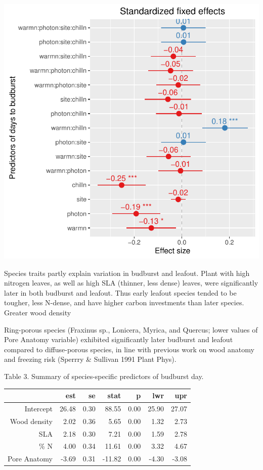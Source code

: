 \documentclass[11pt]{article}
\begin{document}
\includegraphics[scale=0.5]{lmerDBB}


Species traits partly explain variation in budburst and leafout. Plant with high nitrogen leaves, as well as high SLA (thinner, less dense) leaves, were significantly later in both budburst and leafout. Thus early leafout species tended to be tougher, less N-dense, and have higher carbon investments than later species. Greater wood density

Ring-porous species (Fraxinus sp., Lonicera, Myrica, and Quercus; lower values of Pore Anatomy variable) exhibited significantly later budburst and leafout compared to diffuse-porous species, in line with previous work on wood anatomy and freezing risk (Sperrry \& Sullivan 1991 Plant Phys).


Table 3. Summary of species-specific predictors of budburst day. 
\begin{table}[ht]
\centering
\begin{tabular}{rrrrrrr}
  \hline
 & est & se & stat & p & lwr & upr \\ 
  \hline
Intercept & 26.48 & 0.30 & 88.55 & 0.00 & 25.90 & 27.07 \\ 
  Wood density & 2.02 & 0.36 & 5.65 & 0.00 & 1.32 & 2.73 \\ 
  SLA & 2.18 & 0.30 & 7.21 & 0.00 & 1.59 & 2.78 \\ 
  \% N & 4.00 & 0.34 & 11.61 & 0.00 & 3.32 & 4.67 \\ 
  Pore Anatomy & -3.69 & 0.31 & -11.82 & 0.00 & -4.30 & -3.08 \\ 
   \hline
\end{tabular}
\end{table}
\end{document}
